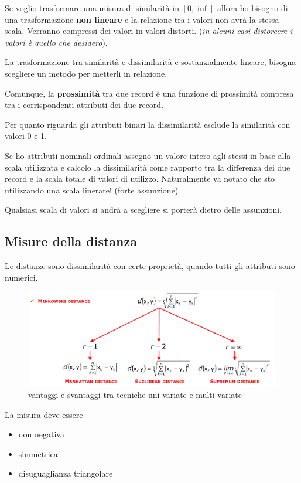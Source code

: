 Se voglio trasformare una misura di similarit\`a in $[0,\inf]$ allora ho bisogno di una trasformazione \textbf{non lineare} e la relazione tra i valori non avr\`a la stessa scala. Verranno compressi dei valori in valori distorti. (\textit{in alcuni casi distorcere i valori \`e quello che desidero}). 

La trasformazione tra similarit\`a e dissimilarit\`a e sostanzialmente lineare, bisogna scegliere un metodo per metterli in relazione. 

Comunque, la \textbf{prossimit\`a} tra due record \`e una funzione di prossimit\`a compresa tra i corrispondenti attributi dei due record.

Per quanto riguarda gli attributi binari la dissimilarit\`a esclude la similarit\`a con valori 0 e 1. 

Se ho attributi nominali ordinali assegno un valore intero agli stessi in base alla scala utilizzata e calcolo la dissimilarit\`a come rapporto tra la differenza dei due record e la scala totale di valori di utilizzo. Naturalmente va notato che sto utilizzando una scala linerare! (forte assunzione)

Qualsiasi scala di valori si andr\`a a scegliere si porter\`a dietro delle assunzioni.

\subsection{Misure della distanza}
Le distanze sono dissimilarit\`a con certe propriet\`a, quando tutti gli attributi sono numerici.

\begin{figure}[h!]
	\centering
	\includegraphics[height=0.4 \linewidth]{pict/distanze_minkowski.png}
	\caption{vantaggi e svantaggi tra tecniche uni-variate e multi-variate}
\end{figure}

La misura deve essere
\begin{itemize}
	\item non negativa
	\item simmetrica
	\item disuguaglianza triangolare
\end{itemize}

